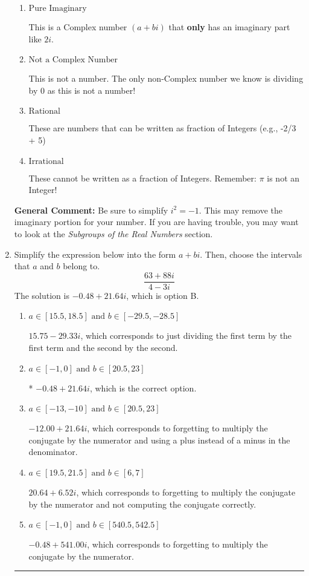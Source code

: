 \documentclass{extbook}[14pt]
\newcommand{\litem}[1]{\item #1

\rule{\textwidth}{0.4pt}}
\begin{document}
\begin{enumerate}
{\begin{enumerate}[label=\Alph*.]
* This is the correct option!
\item \( \text{Pure Imaginary} \)

This is a Complex number $(a+bi)$ that \textbf{only} has an imaginary part like $2i$.
\item \( \text{Not a Complex Number} \)

This is not a number. The only non-Complex number we know is dividing by 0 as this is not a number!
\item \( \text{Rational} \)

These are numbers that can be written as fraction of Integers (e.g., -2/3 + 5)
\item \( \text{Irrational} \)

These cannot be written as a fraction of Integers. Remember: $\pi$ is not an Integer!
\end{enumerate}

\textbf{General Comment:} Be sure to simplify $i^2 = -1$. This may remove the imaginary portion for your number. If you are having trouble, you may want to look at the \textit{Subgroups of the Real Numbers} section.
}
\litem{
Simplify the expression below into the form $a+bi$. Then, choose the intervals that $a$ and $b$ belong to.
\[ \frac{63 + 88 i}{4 - 3 i} \]The solution is \( -0.48  + 21.64 i \), which is option B.\begin{enumerate}[label=\Alph*.]
\item \( a \in [15.5, 18.5] \text{ and } b \in [-29.5, -28.5] \)

 $15.75  - 29.33 i$, which corresponds to just dividing the first term by the first term and the second by the second.
\item \( a \in [-1, 0] \text{ and } b \in [20.5, 23] \)

* $-0.48  + 21.64 i$, which is the correct option.
\item \( a \in [-13, -10] \text{ and } b \in [20.5, 23] \)

 $-12.00  + 21.64 i$, which corresponds to forgetting to multiply the conjugate by the numerator and using a plus instead of a minus in the denominator.
\item \( a \in [19.5, 21.5] \text{ and } b \in [6, 7] \)

 $20.64  + 6.52 i$, which corresponds to forgetting to multiply the conjugate by the numerator and not computing the conjugate correctly.
\item \( a \in [-1, 0] \text{ and } b \in [540.5, 542.5] \)

 $-0.48  + 541.00 i$, which corresponds to forgetting to multiply the conjugate by the numerator.
\end{enumerate}

}
\end{enumerate}
\end{document}
